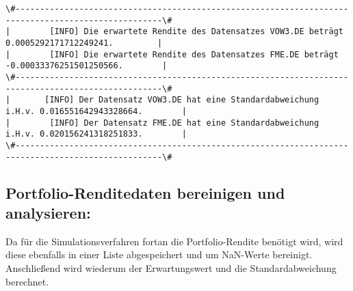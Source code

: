 \documentclass[paper=landscape]{scrartcl}
\begin{document}
    \begin{Verbatim}[commandchars=\\\{\}]
\#----------------------------------------------------------------------------------------------------\#
|        [INFO] Die erwartete Rendite des Datensatzes VOW3.DE beträgt 0.0005292171712249241.         | 
|        [INFO] Die erwartete Rendite des Datensatzes FME.DE beträgt -0.00033376251501250566.        | 
\#----------------------------------------------------------------------------------------------------\#
|       [INFO] Der Datensatz VOW3.DE hat eine Standardabweichung i.H.v. 0.016551642943328664.        | 
|        [INFO] Der Datensatz FME.DE hat eine Standardabweichung i.H.v. 0.020156241318251833.        | 
\#----------------------------------------------------------------------------------------------------\#

    \end{Verbatim}

    \hypertarget{portfolio-renditedaten-bereinigen-und-analysieren}{%
\subsection{Portfolio-Renditedaten bereinigen und
analysieren:}\label{portfolio-renditedaten-bereinigen-und-analysieren}}

Da für die Simulationsverfahren fortan die Portfolio-Rendite benötigt
wird, wird diese ebenfalls in einer Liste abgespeichert und um NaN-Werte
bereinigt. Anschließend wird wiederum der Erwartungswert und die
Standardabweichung berechnet.
\end{document}
